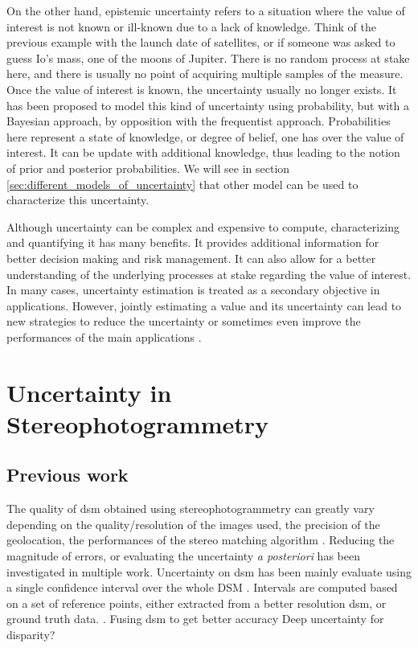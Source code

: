 On the other hand, epistemic uncertainty refers to a situation where the value of interest is not known or ill-known due to a lack of knowledge. Think of the previous example with the launch date of satellites, or if someone was asked to guess Io's mass, one of the moons of Jupiter. There is no random process at stake here, and there is usually no point of acquiring multiple samples of the measure. Once the value of interest is known, the uncertainty usually no longer exists. It has been proposed to model this kind of uncertainty using probability, but with a Bayesian approach, by opposition with the frequentist approach. Probabilities here represent a state of knowledge, or degree of belief, one has over the value of interest. It can be update with additional knowledge, thus leading to the notion of prior and posterior probabilities. We will see in section \ref{sec:different_models_of_uncertainty} that other model can be used to characterize this uncertainty. 

Although uncertainty can be complex and expensive to compute, characterizing and quantifying it has many benefits. It provides additional information for better decision making and risk management. It can also allow for a better understanding of the underlying processes at stake regarding the value of interest. In many cases, uncertainty estimation is treated as a secondary objective in applications. However, jointly estimating a value and its uncertainty can lead to new strategies to reduce the uncertainty or sometimes even improve the performances of the main applications \cite{chen_learning_2023,jiang_unsupervised_2024}.

\section{Uncertainty in Stereophotogrammetry}\label{sec:previous_work_stereo_uncertainty}
\subsection{Previous work}
The quality of \acrshort{dsm} obtained using stereophotogrammetry can greatly vary depending on the quality/resolution of the images used, the precision of the geolocation, the performances of the stereo matching algorithm \etc. Reducing the magnitude of errors, or evaluating the uncertainty \textit{a posteriori} has been investigated in multiple work.
Uncertainty on \acrshort{dsm} has been mainly evaluate using a single confidence interval over the whole DSM \cite{hugonnet_uncertainty_2022, deschamps-berger_apport_2021, wang_robust_2015, oksanen_digital_2006,panagiotakis_validation_2018}. Intervals are computed based on a set of reference points, either extracted from a better resolution \acrshort{dsm}, or ground truth data. . Fusing \acrshort{dsm} to get better accuracy \cite{qin_uncertainty-guided_2022}
\cite{hu_quantitative_2012,poggi_confidence_2021}
Deep uncertainty for disparity?

